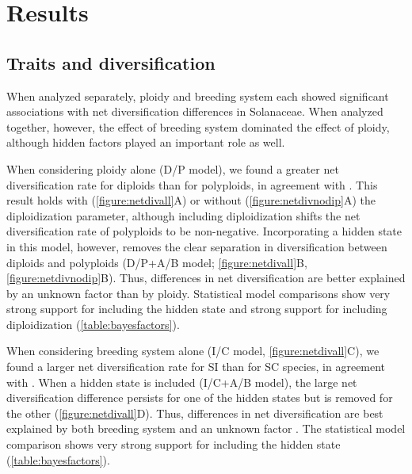 \section{Results}

\subsection{Traits and diversification}

When analyzed separately, ploidy and breeding system each showed significant associations with net diversification differences in Solanaceae.
When analyzed together, however, the effect of breeding system dominated the effect of ploidy, although hidden factors played an important role as well.

When considering ploidy alone (D/P model), we found a greater net diversification rate for diploids than for polyploids, in agreement with \citep{mayrose_2011, mayrose_2015}.
This result holds with (\cref{figure:netdivall}A) or without (\cref{figure:netdivnodip}A) the diploidization parameter, although including diploidization shifts the net diversification rate of polyploids to be non-negative.
Incorporating a hidden state in this model, however, removes the clear separation in diversification between diploids and polyploids (D/P+A/B model; \cref{figure:netdivall}B, \cref{figure:netdivnodip}B).
Thus, differences in net diversification are better explained by an unknown factor than by ploidy.
Statistical model comparisons show very strong support for including the hidden state and strong support for including diploidization (\cref{table:bayesfactors}).

When considering breeding system alone (I/C model, \cref{figure:netdivall}C), we found a larger net diversification rate for SI than for SC species, in agreement with \citet{goldberg_2010}.
When a hidden state is included (I/C+A/B model), the large net diversification difference persists for one of the hidden states but is removed for the other (\cref{figure:netdivall}D).
Thus, differences in net diversification are best explained by both breeding system and an unknown factor \citep[as in Onagraceae;][]{freyman_2018}.
The statistical model comparison shows very strong support for including the hidden state (\cref{table:bayesfactors}).

